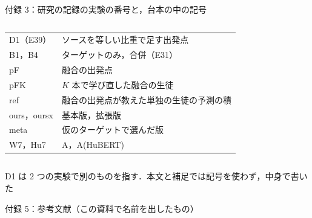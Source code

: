 \begin{frame}{付録 3：研究の記録の実験の番号と，台本の中の記号}
\begin{columns}[T,onlytextwidth]
\begin{column}{0.42\textwidth}
\begin{tabularx}{\linewidth}{@{}l X@{}}
        D1（E39） & ソースを等しい比重で足す出発点 \\
        B1，B4 & ターゲットのみ，合併（E31） \\
        pF & 融合の出発点 \\
        pFK & $K$ 本で学び直した融合の生徒 \\
        ref & 融合の出発点が教えた単独の生徒の予測の積 \\
        ours，oursx & 基本版，拡張版 \\
        meta & 仮のターゲットで選んだ版 \\
        W7，Hu7 & A，A(HuBERT) \\
        \bottomrule
      \end{tabularx}
    \end{column}
  \end{columns}
  \vspace{0.3em}
  {\raggedright\tiny D1 は 2 つの実験で別のものを指す．本文と補足では記号を使わず，中身で書いた\par}
\end{frame}


\nocite{bendavid2010theory,schuller2010crosscorpus,busso2008iemocap,zadeh2018mosei,poria2019meld,dhall2012afew,livingstone2018ravdess,cao2014cremad,chen2022wavlm,hsu2021hubert,liu2019roberta,he2023debertav3,ryumina2022facial,radford2021clip,yolov8face,cao2018vggface2,mollahosseini2019affectnet,kumar2022lpft,gulrajani2021domainbed,okamoto1963asymptotic,raudys1998intrinsic,dobriban2018highdimensional,desilva2023value,pregibon1981logistic,koh2019accuracy,kimeldorf1971results,scholkopf2001generalized,chaloner1984optimal,chaloner1995bayesian,vapnik2009new,lopezpaz2016unifying,lee2013pseudolabel,grandvalet2004semisupervised,hinton2015distilling,blum1998combining,sindhwani2005coregularization,saerens2002adjusting,veilleux2021realistic}
\begin{frame}[allowframebreaks]{付録 5：参考文献（この資料で名前を出したもの）}
  \label{a:refs}
  \tiny
  
\end{frame}
